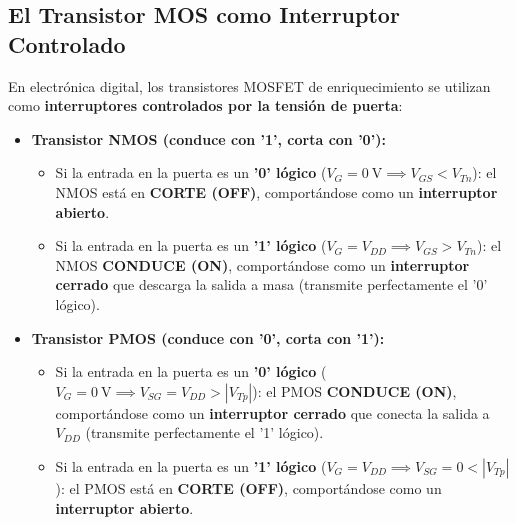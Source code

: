 \subsection{El Transistor MOS como Interruptor Controlado}
En electrónica digital, los transistores MOSFET de enriquecimiento se utilizan como \textbf{interruptores controlados por la tensión de puerta}:
\begin{itemize}[leftmargin=*]
    \item \textbf{Transistor NMOS (conduce con '1', corta con '0'):}
    \begin{itemize}
        \item Si la entrada en la puerta es un \textbf{'0' lógico} ($V_G = 0\ \si{\volt} \implies V_{GS} < V_{Tn}$): el NMOS está en \textbf{CORTE (OFF)}, comportándose como un \textbf{interruptor abierto}.
        \item Si la entrada en la puerta es un \textbf{'1' lógico} ($V_G = V_{DD} \implies V_{GS} > V_{Tn}$): el NMOS \textbf{CONDUCE (ON)}, comportándose como un \textbf{interruptor cerrado} que descarga la salida a masa (transmite perfectamente el '0' lógico).
    \end{itemize}
    \item \textbf{Transistor PMOS (conduce con '0', corta con '1'):}
    \begin{itemize}
        \item Si la entrada en la puerta es un \textbf{'0' lógico} ($V_G = 0\ \si{\volt} \implies V_{SG} = V_{DD} > |V_{Tp}|$): el PMOS \textbf{CONDUCE (ON)}, comportándose como un \textbf{interruptor cerrado} que conecta la salida a $V_{DD}$ (transmite perfectamente el '1' lógico).
        \item Si la entrada en la puerta es un \textbf{'1' lógico} ($V_G = V_{DD} \implies V_{SG} = 0 < |V_{Tp}|$): el PMOS está en \textbf{CORTE (OFF)}, comportándose como un \textbf{interruptor abierto}.
    \end{itemize}
\end{itemize}

